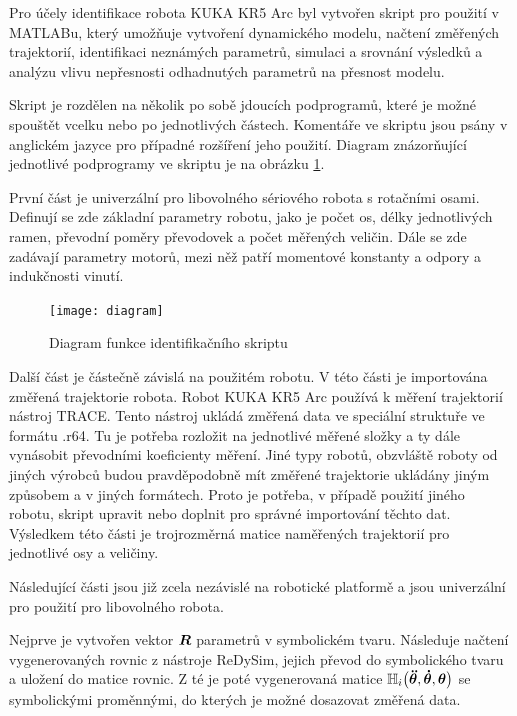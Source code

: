 Pro účely identifikace robota KUKA KR5 Arc byl vytvořen skript pro použití v MATLABu, který umožňuje vytvoření dynamického modelu, načtení změřených trajektorií, identifikaci neznámých parametrů, simulaci a srovnání výsledků a analýzu vlivu nepřesnosti odhadnutých parametrů na přesnost modelu.

Skript je rozdělen na několik po sobě jdoucích podprogramů, které je možné spouštět vcelku nebo po jednotlivých částech. Komentáře ve skriptu jsou psány v anglickém jazyce pro případné rozšíření jeho použití. Diagram znázorňující jednotlivé podprogramy ve skriptu je na obrázku \ref{diagram_pic}.

První část je univerzální pro libovolného sériového robota s rotačními osami. Definují se zde základní parametry robotu, jako je počet os, délky jednotlivých ramen, převodní poměry převodovek a počet měřených veličin. Dále se zde zadávají parametry motorů, mezi něž patří momentové konstanty a odpory a indukčnosti vinutí. 

\begin{figure}[ht]
    \texttt{[image: diagram]}
    \caption{Diagram funkce identifikačního skriptu}
    \label{diagram_pic}
\end{figure}

Další část je částečně závislá na použitém robotu. V této části je importována změřená trajektorie robota. Robot KUKA KR5 Arc používá k měření trajektorií nástroj TRACE. Tento nástroj ukládá změřená data ve speciální struktuře ve formátu .r64. Tu je potřeba rozložit na jednotlivé měřené složky a ty dále vynásobit převodními koeficienty měření. Jiné typy robotů, obzvláště roboty od jiných výrobců budou pravděpodobně mít změřené trajektorie ukládány jiným způsobem a v jiných formátech. Proto je potřeba, v případě použití jiného robotu, skript upravit nebo doplnit pro správné importování těchto dat. Výsledkem této části je trojrozměrná matice naměřených trajektorií pro jednotlivé osy a veličiny. 

Následující části jsou již zcela nezávislé na robotické platformě a jsou univerzální pro použití pro libovolného robota.  

Nejprve je vytvořen vektor $\boldsymbol{R}$ parametrů v symbolickém tvaru. Následuje načtení vygenerovaných rovnic z nástroje ReDySim, jejich převod do symbolického tvaru a uložení do matice rovnic. Z té je poté vygenerovaná matice $\mathbb{H}_i\big(\boldsymbol{\ddot{\theta}},\boldsymbol{\dot{\theta}},\boldsymbol{\theta}\big)$ se symbolickými proměnnými, do kterých je možné dosazovat změřená data.

